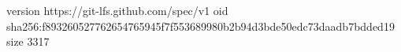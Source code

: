 version https://git-lfs.github.com/spec/v1
oid sha256:f893260527762654765945f7f553689980b2b94d3bde50edc73daadb7bdded19
size 3317
